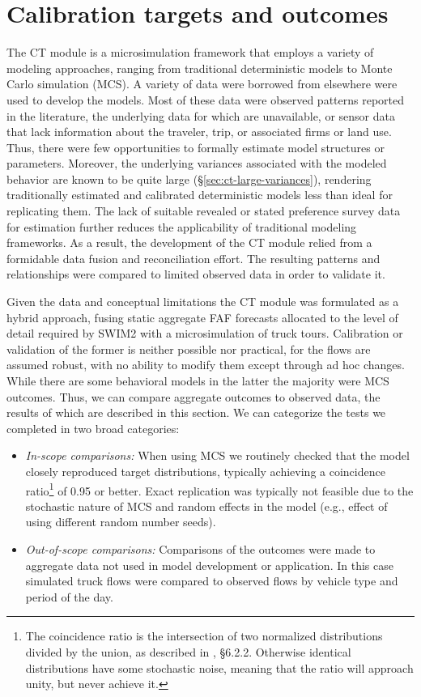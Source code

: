 \section{Calibration targets and outcomes}

The CT module is a microsimulation framework that employs a variety of modeling approaches, ranging from traditional deterministic models to Monte Carlo simulation (MCS). A variety of data were borrowed from elsewhere were used to develop the models. Most of these data were observed patterns reported in the literature, the underlying data for which are unavailable, or sensor data that lack information about the traveler, trip, or associated firms or land use. Thus, there were few opportunities to formally estimate model structures or parameters. Moreover, the underlying variances associated with the modeled behavior are known to be quite large (\S\ref{sec:ct-large-variances}), rendering traditionally estimated and calibrated deterministic models less than ideal for replicating them. The lack of suitable revealed or stated preference survey data for estimation further reduces the applicability of traditional modeling frameworks. As a result, the development of the CT module relied from a formidable data fusion and reconciliation effort. The resulting patterns and relationships were compared to limited observed data in order to validate it.

Given the data and conceptual limitations the CT module was formulated as a hybrid approach, fusing static aggregate FAF forecasts allocated to the level of detail required by SWIM2 with a microsimulation of truck tours. Calibration or validation of the former is neither possible nor practical, for the flows are assumed robust, with no ability to modify them except through ad hoc changes. While there are some behavioral models in the latter the majority were MCS outcomes. Thus, we can compare aggregate outcomes to observed data, the results of which are described in this section. We can categorize the tests we completed in two broad categories:
\begin{itemize}
\item \textit{In-scope comparisons:} When using MCS we routinely checked that the model closely reproduced target distributions, typically achieving a coincidence ratio\footnote{The coincidence ratio is the intersection of two normalized distributions divided by the union, as described in \cite{cambridge10}, \S6.2.2. Otherwise identical distributions have some stochastic noise, meaning that the ratio will approach unity, but never achieve it.} of 0.95 or better. Exact replication was typically not feasible due to the stochastic nature of MCS and random effects in the model (e.g., effect of using different random number seeds). 
\item \textit{Out-of-scope comparisons:} Comparisons of the outcomes were made to aggregate data not used in model development or application. In this case simulated truck flows were compared to observed flows by vehicle type and period of the day.
\end{itemize}

